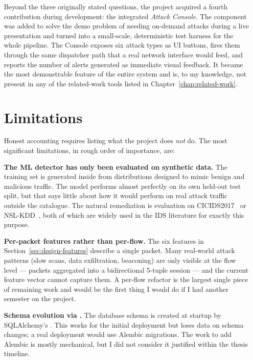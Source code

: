 Beyond the three originally stated questions, the project
acquired a fourth contribution during development: the integrated
\emph{Attack Console}. The component was added to solve the
demo problem of needing on-demand attacks during a live
presentation and turned into a small-scale, deterministic test
harness for the whole pipeline. The Console exposes six attack
types as UI buttons, fires them through the same dispatcher path
that a real network interface would feed, and reports the number
of alerts generated as immediate visual feedback. It became the
most demonstrable feature of the entire system and is, to my
knowledge, not present in any of the related-work tools listed
in Chapter~\ref{chap:related-work}.

\section{Limitations}
\label{sec:conc-limitations}

Honest accounting requires listing what the project does
\emph{not} do. The most significant limitations, in rough order
of importance, are:

\textbf{The ML detector has only been evaluated on synthetic
data.} The training set is generated inside
 from distributions designed to mimic
benign and malicious traffic. The model performs almost
perfectly on its own held-out test split, but that says little
about how it would perform on real attack traffic outside the
catalogue. The natural remediation is evaluation on
CICIDS2017~\cite{sharafaldin2018cicids} or
NSL-KDD~\cite{tavallaee2009detailed}, both of which are widely
used in the IDS literature for exactly this purpose.

\textbf{Per-packet features rather than per-flow.} The six
features in Section~\ref{sec:design-features} describe a
single packet. Many real-world attack patterns (slow scans,
data exfiltration, beaconing) are only visible at the flow level
--- packets aggregated into a bidirectional 5-tuple session ---
and the current feature vector cannot capture them. A
per-flow refactor is the largest single piece of remaining work
and would be the first thing I would do if I had another
semester on the project.

\textbf{Schema evolution via .} The database
schema is created at startup by SQLAlchemy's
. This works for the initial
deployment but loses data on schema changes; a real deployment
would use Alembic migrations. The work to add Alembic is
mostly mechanical, but I did not consider it justified within
the thesis timeline.

